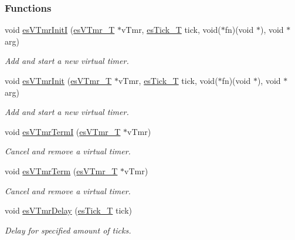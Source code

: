 \subsubsection*{Functions}
\begin{DoxyCompactItemize}
\item 
void \hyperlink{group__kern__vtmr_ga45fe650eac73e7fe203cc81565401555}{es\-V\-Tmr\-Init\-I} (\hyperlink{group__kern__vtmr_ga3c020f0ca54ff412bc1d1505502d2afc}{es\-V\-Tmr\-\_\-\-T} $\ast$v\-Tmr, \hyperlink{group__kern__vtmr_ga844873888c186ee81eb66620dadb0451}{es\-Tick\-\_\-\-T} tick, void($\ast$fn)(void $\ast$), void $\ast$arg)
\begin{DoxyCompactList}\small\item\em Add and start a new virtual timer. \end{DoxyCompactList}\item 
void \hyperlink{group__kern__vtmr_gad932cf00aec4ba03a0df02ccc493c4c2}{es\-V\-Tmr\-Init} (\hyperlink{group__kern__vtmr_ga3c020f0ca54ff412bc1d1505502d2afc}{es\-V\-Tmr\-\_\-\-T} $\ast$v\-Tmr, \hyperlink{group__kern__vtmr_ga844873888c186ee81eb66620dadb0451}{es\-Tick\-\_\-\-T} tick, void($\ast$fn)(void $\ast$), void $\ast$arg)
\begin{DoxyCompactList}\small\item\em Add and start a new virtual timer. \end{DoxyCompactList}\item 
void \hyperlink{group__kern__vtmr_ga96bb2c81f649c0305dfd08d1c79b2e37}{es\-V\-Tmr\-Term\-I} (\hyperlink{group__kern__vtmr_ga3c020f0ca54ff412bc1d1505502d2afc}{es\-V\-Tmr\-\_\-\-T} $\ast$v\-Tmr)
\begin{DoxyCompactList}\small\item\em Cancel and remove a virtual timer. \end{DoxyCompactList}\item 
void \hyperlink{group__kern__vtmr_gad6ec93a68e3526f18ed926cd441878cd}{es\-V\-Tmr\-Term} (\hyperlink{group__kern__vtmr_ga3c020f0ca54ff412bc1d1505502d2afc}{es\-V\-Tmr\-\_\-\-T} $\ast$v\-Tmr)
\begin{DoxyCompactList}\small\item\em Cancel and remove a virtual timer. \end{DoxyCompactList}\item 
void \hyperlink{group__kern__vtmr_ga26d10c6aaa0cd1d04261d2c9911e890d}{es\-V\-Tmr\-Delay} (\hyperlink{group__kern__vtmr_ga844873888c186ee81eb66620dadb0451}{es\-Tick\-\_\-\-T} tick)
\begin{DoxyCompactList}\small\item\em Delay for specified amount of ticks. \end{DoxyCompactList}\end{DoxyCompactItemize}


